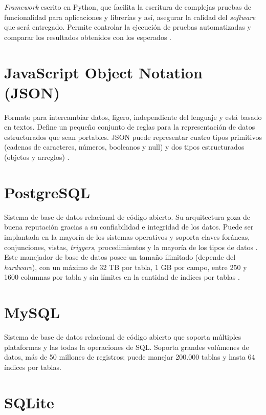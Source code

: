\textit{Framework} escrito en Python, que facilita la escritura de
complejas pruebas de funcionalidad para aplicaciones y librerías y así,
asegurar la calidad del \textit{software} que será entregado. Permite controlar
la ejecución de pruebas automatizadas y comparar los resultados obtenidos con los esperados \cite{pytest}.

\section{JavaScript Object Notation (JSON)}

Formato para intercambiar datos, ligero, independiente del lenguaje y está basado en textos. Define un pequeño conjunto de reglas para la representación de datos estructurados que sean portables. JSON puede representar cuatro tipos primitivos (cadenas de caracteres, números, booleanos y null) y dos tipos estructurados (objetos y arreglos) \cite{JSON}.

\section{PostgreSQL}

Sistema de base de datos relacional de código abierto. Su arquitectura goza de buena reputación gracias a su confiabilidad e integridad de los datos. Puede ser implantada en la mayoría de los sistemas operativos y soporta claves foráneas, conjunciones, vistas, \textit{triggers}, procedimientos y la mayoría de los tipos de datos \cite{PostgreSQL}. \\

Este manejador de base de datos posee un tamaño ilimitado (depende del \textit{hardware}), con un máximo de 32 TB por tabla, 1 GB por campo, entre 250 y 1600 columnas por tabla y sin límites en la cantidad de índices por tablas \cite{PostgreSQL}.

\section{MySQL}

Sistema de base de datos relacional de código abierto que soporta múltiples plataformas y las todas la operaciones de SQL. Soporta grandes volúmenes de datos, más de 50 millones de registros; puede manejar 200.000 tablas y hasta 64 índices por tablas\cite{MySQL}.

\section{SQLite}


